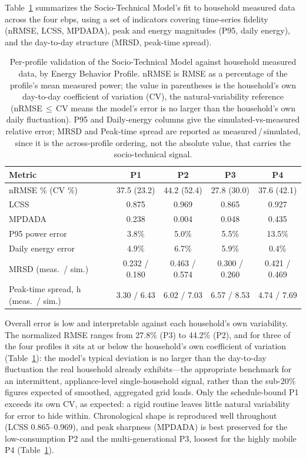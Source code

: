 \documentclass[final,3p,times,onecolumn]{elsarticle}
\begin{document}
Table~\ref{tab:perprofile_validation} summarizes the Socio-Technical Model's fit to household measured data across the four \glspl{ebp}, using a set of indicators covering time-series fidelity (nRMSE, LCSS, MPDADA), peak and energy magnitudes (P95, daily energy), and the day-to-day structure (MRSD, peak-time spread).

\begin{table}[H]
\centering
\caption{Per-profile validation of the Socio-Technical Model against household measured data, by Energy Behavior Profile. nRMSE is RMSE as a percentage of the profile's mean measured power; the value in parentheses is the household's own day-to-day coefficient of variation (CV), the natural-variability reference (nRMSE\,$\le$\,CV means the model's error is no larger than the household's own daily fluctuation). P95 and Daily-energy columns give the simulated-vs-measured relative error; MRSD and Peak-time spread are reported as measured\,/\,simulated, since it is the across-profile ordering, not the absolute value, that carries the socio-technical signal.}
\label{tab:perprofile_validation}
\begin{tabular}{lcccc}
\toprule
Metric & P1 & P2 & P3 & P4 \\
\midrule
nRMSE \% (CV \%)                    & 37.5 (23.2) & 44.2 (52.4) & 27.8 (30.0) & 37.6 (42.1) \\
LCSS                                & 0.875 & 0.969 & 0.865 & 0.927 \\
MPDADA                              & 0.238 & 0.004 & 0.048 & 0.435 \\
P95 power error                     & 3.8\% & 5.0\% & 5.5\% & 13.5\% \\
Daily energy error                  & 4.9\% & 6.7\% & 5.9\% & 0.4\% \\
MRSD (meas.\ / sim.)                & 0.232 / 0.180 & 0.463 / 0.574 & 0.300 / 0.260 & 0.421 / 0.469 \\
Peak-time spread, h (meas.\ / sim.) & 3.30 / 6.43 & 6.02 / 7.03 & 6.57 / 8.53 & 4.74 / 7.69 \\
\bottomrule
\end{tabular}
\end{table}

Overall error is low and interpretable against each household's own variability. The normalized RMSE ranges from 27.8\% (P3) to 44.2\% (P2), and for three of the four profiles it sits at or below the household's own coefficient of variation (Table~\ref{tab:perprofile_validation}): the model's typical deviation is no larger than the day-to-day fluctuation the real household already exhibits---the appropriate benchmark for an intermittent, appliance-level single-household signal, rather than the sub-20\% figures expected of smoothed, aggregated grid loads. Only the schedule-bound P1 exceeds its own CV, as expected: a rigid routine leaves little natural variability for error to hide within. Chronological shape is reproduced well throughout (LCSS 0.865--0.969), and peak sharpness (MPDADA) is best preserved for the low-consumption P2 and the multi-generational P3, loosest for the highly mobile P4 (Table~\ref{tab:perprofile_validation}).
\end{document}
